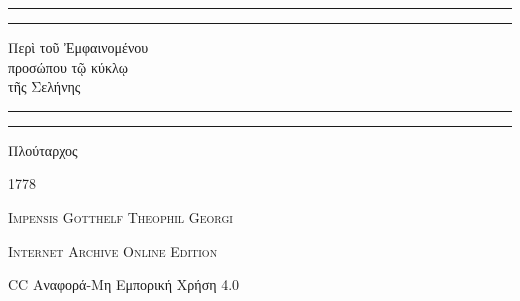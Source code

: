 \documentclass[a4paper, 11pt, oneside, polutonikogreek, german]{article}
\begin{document}
\bfseries
\renewcommand\thefootnote{\bfseries{\color{Cerulean}\tiny\arabic{footnote}}}
\let\oldfootnote\footnote
    \renewcommand{\footnote}[1]{\oldfootnote{\color{Cerulean}\bfseries\small#1}}
\begin{titlepage} %
	\centering %


	\rule{\textwidth}{1.6pt}\vspace*{-\baselineskip}\vspace*{2pt} %
	\rule{\textwidth}{0.4pt} %
	
	\vspace{1\baselineskip} %
	
	{\Huge Περὶ τοῦ Ἐμφαινομένου \\ προσώπου τῷ κύκλῳ \\ τῆς Σελήνης}
	
	\vspace{1\baselineskip} %

	\rule{\textwidth}{0.4pt}\vspace*{-\baselineskip}\vspace{3.2pt} %
	\rule{\textwidth}{1.6pt} %
	
	\vspace{1\baselineskip} %
	
	
	{\Large Πλούταρχος}
 
        \vspace{0.5\baselineskip}
	
	\vspace*{1\baselineskip} %
	
        {\scshape \normalsize } %

        \vspace*{\fill}    

	\vspace{1\baselineskip}

	{\small\scshape 1778}
	
	{\small\scshape{Impensis Gotthelf Theophil Georgi}}
	
	\vspace{0.5\baselineskip} %

        {\scshape Internet Archive Online Edition}%
    
	{\small CC Αναφορά-Μη Εμπορική Χρήση 4.0} %
\end{titlepage}
\setlength{\parskip}{1mm plus1mm minus1mm}
\clearpage
\large
\end{document}
